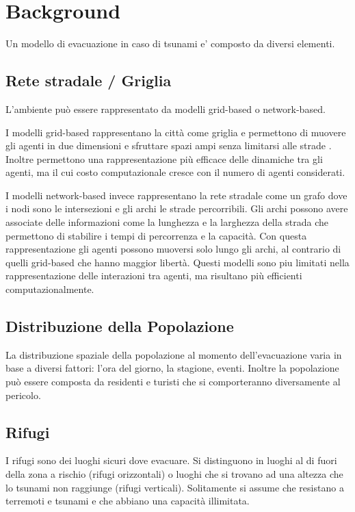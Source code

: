 \section{Background}
\label{sec:background}
Un modello di evacuazione in caso di tsunami e' composto da diversi elementi.

\subsection{Rete stradale / Griglia}
L'ambiente può essere rappresentato da modelli grid-based o network-based.

I modelli grid-based rappresentano la città come griglia e permettono di muovere gli agenti in due dimensioni 
e sfruttare spazi ampi senza limitarsi alle strade \parencite{makinoshima2018enhancing}.
Inoltre permettono una rappresentazione più efficace delle dinamiche tra gli agenti, ma il cui costo computazionale 
cresce con il numero di agenti considerati.

I modelli network-based invece rappresentano la rete stradale come un grafo dove i nodi sono le intersezioni e gli archi le strade percorribili.
Gli archi possono avere associate delle informazioni come la lunghezza e la larghezza della strada che permettono di stabilire i tempi di percorrenza e la capacità.
Con questa rappresentazione gli agenti possono muoversi solo lungo gli archi, al contrario di quelli grid-based che hanno maggior libertà.
Questi modelli sono piu limitati nella rappresentazione delle interazioni tra agenti, ma risultano più efficienti computazionalmente.

\subsection{Distribuzione della Popolazione}
La distribuzione spaziale della popolazione al momento dell'evacuazione varia in base a diversi fattori:
l'ora del giorno, la stagione, eventi. Inoltre la popolazione può essere composta da residenti e
turisti che si comporteranno diversamente al pericolo.

\subsection{Rifugi}
I rifugi sono dei luoghi sicuri dove evacuare.
Si distinguono in luoghi al di fuori della zona a rischio (rifugi orizzontali) o
luoghi che si trovano ad una altezza che lo tsunami non raggiunge (rifugi verticali).
%
Solitamente si assume che resistano a terremoti e tsunami e
che abbiano una capacità illimitata.

